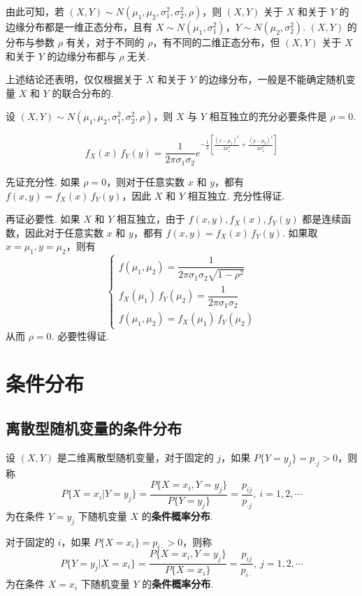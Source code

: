 由此可知，若 $(X,Y) \sim N(\mu_1,\mu_2,\sigma_1^2,\sigma_2^2,\rho)$，则 $(X,Y)$ 关于 $X$ 和关于 $Y$ 的边缘分布都是一维正态分布，且有 $X \sim N(\mu_1,\sigma_1^2)$，$Y \sim N(\mu_2,\sigma_2^2)$. $(X,Y)$ 的分布与参数 $\rho$ 有关，对于不同的 $\rho$，有不同的二维正态分布，但 $(X,Y)$ 关于 $X$ 和关于 $Y$ 的边缘分布都与 $\rho$ 无关.

上述结论还表明，仅仅根据关于 $X$ 和关于 $Y$ 的边缘分布，一般是不能确定随机变量 $X$ 和 $Y$ 的联合分布的.

\begin{conclusion}
    设 $(X,Y) \sim N(\mu_1,\mu_2,\sigma_1^2,\sigma_2^2,\rho)$，则 $X$ 与 $Y$ 相互独立的充分必要条件是 $\rho=0$.
\end{conclusion}

\begin{myproof}
    $$
    f_{X}(x) \, f_{Y}(y) = \dfrac{1}{2 \pi \sigma_1 \sigma_2} e^{-\frac{1}{2} \left[ \frac{(x-\mu_1)^2}{2 \sigma_1^2} + \frac{(y-\mu_2)^2}{2 \sigma_2^2} \right]}
    $$

    先证充分性. 如果 $\rho=0$，则对于任意实数 $x$ 和 $y$，都有 $f(x,y) = f_{X}(x) \, f_{Y}(y)$，因此 $X$ 和 $Y$ 相互独立. 充分性得证.

    再证必要性. 如果 $X$ 和 $Y$ 相互独立，由于 $f(x,y), f_{X}(x), f_{Y}(y)$ 都是连续函数，因此对于任意实数 $x$ 和 $y$，都有 $f(x,y) = f_{X}(x) \, f_{Y}(y)$. 如果取 $x=\mu_1, y=\mu_2$，则有
    $$
    \begin{cases}
        f(\mu_1,\mu_2) = \dfrac{1}{2 \pi \sigma_1 \sigma_2 \sqrt{1-\rho^2}} \\[0.5em]
        f_{X}(\mu_1) \, f_{Y}(\mu_2) = \dfrac{1}{2 \pi \sigma_1 \sigma_2} \\[0.5em]
        f(\mu_1,\mu_2) = f_{X}(\mu_1) \, f_{Y}(\mu_2)
    \end{cases}
    $$
    从而 $\rho=0$. 必要性得证.
\end{myproof}

\section{条件分布}

\subsection{离散型随机变量的条件分布}

\begin{definition}
    设 $(X,Y)$ 是二维离散型随机变量，对于固定的 $j$，如果 $P\{Y = y_j\} = p_{\cdot j} > 0$，则称
    $$
    P\{X=x_i | Y=y_j\} = \dfrac{P\{X=x_i, Y=y_j\}}{P\{Y=y_j\}} = \dfrac{p_{ij}}{p_{\cdot j}},\ i=1,2,\cdots
    $$
    为在条件 $Y=y_j$ 下随机变量 $X$ 的\textbf{条件概率分布}.
    
    对于固定的 $i$，如果 $P\{X=x_i\} = p_{i \cdot} > 0$，则称
    $$
    P\{Y=y_j | X=x_i\} = \dfrac{P\{X=x_i,Y=y_j\}}{P\{X=x_i\}} = \dfrac{p_{ij}}{p_{i \cdot}},\ j=1,2,\cdots
    $$
    为在条件 $X=x_i$ 下随机变量 $Y$ 的\textbf{条件概率分布}.
\end{definition}

